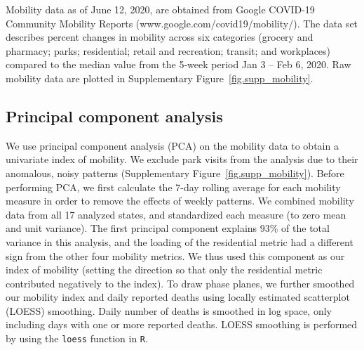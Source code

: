 Mobility data as of June 12, 2020, are obtained from Google COVID-19 Community Mobility Reports (www.google.com/covid19/mobility/).
The data set describes percent changes in mobility across six categories (grocery and pharmacy; parks; residential; retail and recreation; transit; and workplaces)
compared to the median value from the 5‑week period Jan 3 – Feb 6, 2020.
Raw mobility data are plotted in Supplementary Figure~\ref{fig.supp_mobility}.

\subsection{Principal component analysis}

We use principal component analysis (PCA) on the mobility data to obtain a univariate index of mobility. 
We exclude park visits from the analysis due to their anomalous, noisy patterns (Supplementary Figure~\ref{fig.supp_mobility}).
Before performing PCA, we first calculate the 7-day rolling average for each mobility measure in order to remove the effects of weekly patterns.
We combined mobility data from all 17 analyzed states, and standardized each measure (to zero mean and unit variance). 
The first principal component explains 93\% of the total variance in this analysis, and the loading of the residential metric had a different sign from the other four mobility metrics. 
We thus used this component as our index of mobility (setting the direction so that only the residential metric contributed negatively to the index).
To draw phase planes, we further smoothed our mobility index and daily reported deaths using locally estimated scatterplot (LOESS) smoothing.
Daily number of deaths is smoothed in log space, only including days with one or more reported deaths.
LOESS smoothing is performed by using the \texttt{loess} function in \texttt{R}.


